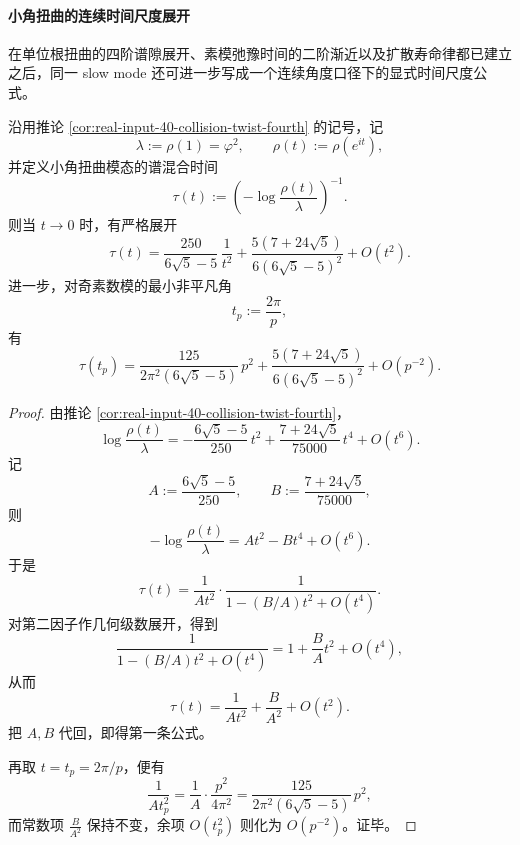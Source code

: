 \paragraph{小角扭曲的连续时间尺度展开}
在单位根扭曲的四阶谱隙展开、素模弛豫时间的二阶渐近以及扩散寿命律都已建立之后，同一 slow mode 还可进一步写成一个连续角度口径下的显式时间尺度公式。

\begin{theorem}[小角扭曲模态的谱混合时间具有显式二阶展开]\label{thm:xi-time-part9oe-small-angle-twist-mixingtime-second-order}
沿用推论 \ref{cor:real-input-40-collision-twist-fourth} 的记号，记
\[
\lambda:=\rho(1)=\varphi^2,
\qquad
\rho(t):=\rho(e^{it}),
\]
并定义小角扭曲模态的谱混合时间
\[
\tau(t):=\left(-\log\frac{\rho(t)}{\lambda}\right)^{-1}.
\]
则当 \(t\to 0\) 时，有严格展开
\[
\boxed{\;
\tau(t)
=
\frac{250}{6\sqrt5-5}\,\frac{1}{t^2}
+
\frac{5(7+24\sqrt5)}{6(6\sqrt5-5)^2}
+
O(t^2).\;}
\]
进一步，对奇素数模的最小非平凡角
\[
t_p:=\frac{2\pi}{p},
\]
有
\[
\boxed{\;
\tau(t_p)
=
\frac{125}{2\pi^2(6\sqrt5-5)}\,p^2
+
\frac{5(7+24\sqrt5)}{6(6\sqrt5-5)^2}
+
O(p^{-2}).\;}
\]
\end{theorem}
\begin{proof}
由推论 \ref{cor:real-input-40-collision-twist-fourth}，
\[
\log\frac{\rho(t)}{\lambda}
=
-\frac{6\sqrt5-5}{250}\,t^2
+
\frac{7+24\sqrt5}{75000}\,t^4
+
O(t^6).
\]
记
\[
A:=\frac{6\sqrt5-5}{250},
\qquad
B:=\frac{7+24\sqrt5}{75000},
\]
则
\[
-\log\frac{\rho(t)}{\lambda}=A t^2-B t^4+O(t^6).
\]
于是
\[
\tau(t)
=
\frac{1}{A t^2}\cdot\frac{1}{1-(B/A)t^2+O(t^4)}.
\]
对第二因子作几何级数展开，得到
\[
\frac{1}{1-(B/A)t^2+O(t^4)}
=
1+\frac{B}{A}t^2+O(t^4),
\]
从而
\[
\tau(t)=\frac{1}{A t^2}+\frac{B}{A^2}+O(t^2).
\]
把 \(A,B\) 代回，即得第一条公式。

再取 \(t=t_p=2\pi/p\)，便有
\[
\frac{1}{A t_p^2}
=
\frac{1}{A}\cdot\frac{p^2}{4\pi^2}
=
\frac{125}{2\pi^2(6\sqrt5-5)}\,p^2,
\]
而常数项 \(\frac{B}{A^2}\) 保持不变，余项 \(O(t_p^2)\) 则化为 \(O(p^{-2})\)。证毕。
\end{proof}

\endinput
